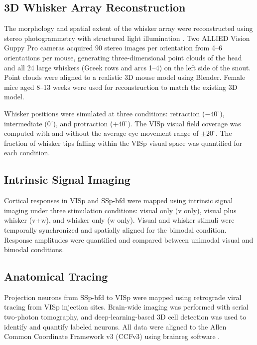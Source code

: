 \documentclass[11pt]{article}
\begin{document}
\subsection{3D Whisker Array Reconstruction}

The morphology and spatial extent of the whisker array were reconstructed using stereo photogrammetry with structured light illumination \citep{heist2018gobo}. Two ALLIED Vision Guppy Pro cameras acquired 90 stereo images per orientation from 4--6 orientations per mouse, generating three-dimensional point clouds of the head and all 24 large whiskers (Greek rows and arcs 1--4) on the left side of the snout. Point clouds were aligned to a realistic 3D mouse model using Blender. Female mice aged 8--13 weeks were used for reconstruction to match the existing 3D model.

Whisker positions were simulated at three conditions: retraction ($-40^{\circ}$), intermediate ($0^{\circ}$), and protraction ($+40^{\circ}$). The VISp visual field coverage was computed with and without the average eye movement range of $\pm 20^{\circ}$. The fraction of whisker tips falling within the VISp visual space was quantified for each condition.

\subsection{Intrinsic Signal Imaging}

Cortical responses in VISp and SSp-bfd were mapped using intrinsic signal imaging under three stimulation conditions: visual only (v only), visual plus whisker (v+w), and whisker only (w only). Visual and whisker stimuli were temporally synchronized and spatially aligned for the bimodal condition. Response amplitudes were quantified and compared between unimodal visual and bimodal conditions.

\subsection{Anatomical Tracing}

Projection neurons from SSp-bfd to VISp were mapped using retrograde viral tracing from VISp injection sites. Brain-wide imaging was performed with serial two-photon tomography, and deep-learning-based 3D cell detection was used to identify and quantify labeled neurons. All data were aligned to the Allen Common Coordinate Framework v3 (CCFv3) using brainreg software \citep{tyson2022accurate, wang2020allen}.
\end{document}
